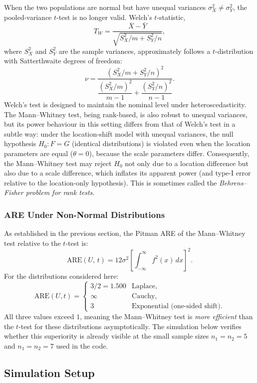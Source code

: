 \documentclass[10pt]{article}
\begin{document}
When the two populations are normal but have unequal variances
$\sigma_X^2 \neq \sigma_Y^2$, the pooled-variance $t$-test is no longer valid.
Welch's $t$-statistic,
\[
  T_W = \frac{\bar{X} - \bar{Y}}{\sqrt{S_X^2/m + S_Y^2/n}},
\]
where $S_X^2$ and $S_Y^2$ are the sample variances, approximately follows a
$t$-distribution with Satterthwaite degrees of freedom:
\[
  \nu = \frac{\left(S_X^2/m + S_Y^2/n\right)^2}
             {\dfrac{(S_X^2/m)^2}{m-1} + \dfrac{(S_Y^2/n)^2}{n-1}}.
\]
Welch's test is designed to maintain the nominal level under heteroscedasticity.
The Mann--Whitney test, being rank-based, is also robust to unequal variances,
but its power behaviour in this setting differs from that of Welch's test in a
subtle way: under the location-shift model with unequal variances, the null
hypothesis $H_0: F = G$ (identical distributions) is violated even when the
location parameters are equal ($\theta = 0$), because the scale parameters
differ. Consequently, the Mann--Whitney test may reject $H_0$ not only due to
a location difference but also due to a scale difference, which inflates
its apparent power (and type-I error relative to the location-only hypothesis).
This is sometimes called the \textit{Behrens--Fisher problem for rank tests}.

\subsubsection{ARE Under Non-Normal Distributions}

As established in the previous section, the Pitman ARE of the Mann--Whitney
test relative to the $t$-test is:
\[
  \mathrm{ARE}(U,\,t) = 12\sigma^2\!\left[\int_{-\infty}^{\infty} f^2(x)\,dx\right]^2.
\]
For the distributions considered here:
\[
  \mathrm{ARE}(U,t) = \begin{cases}
      3/2 = 1.500 & \text{Laplace},\\[4pt]
      \infty       & \text{Cauchy},\\[4pt]
      3            & \text{Exponential (one-sided shift).}
  \end{cases}
\]
All three values exceed $1$, meaning the Mann--Whitney test is \textit{more
efficient} than the $t$-test for these distributions asymptotically. The
simulation below verifies whether this superiority is already visible at the
small sample sizes $n_1 = n_2 = 5$ and $n_1 = n_2 = 7$ used in the code.

\subsection{Simulation Setup}
\end{document}
